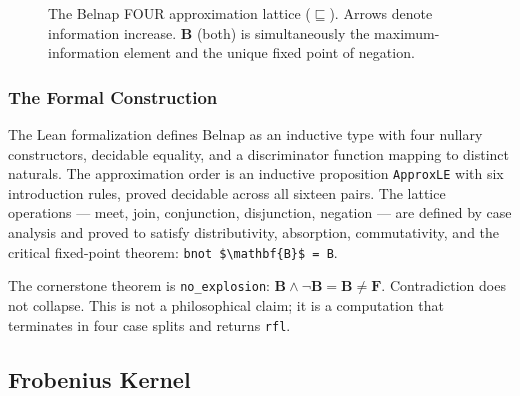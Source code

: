 \documentclass[10pt,a4paper]{article}
\begin{document}
\begin{figure}[htbp]
\centering
{}
\caption{The Belnap FOUR approximation lattice ($\sqsubseteq$). Arrows denote
information increase. $\mathbf{B}$ (both) is simultaneously the maximum-information
element and the unique fixed point of negation.}
\label{fig:belnap-four}
\end{figure}


\subsubsection{The Formal Construction}

The Lean formalization defines Belnap as an inductive type with four nullary constructors, decidable equality, and a discriminator function mapping to distinct naturals. The approximation order is an inductive proposition \texttt{ApproxLE} with six introduction rules, proved decidable across all sixteen pairs. The lattice operations --- meet, join, conjunction, disjunction, negation --- are defined by case analysis and proved to satisfy distributivity, absorption, commutativity, and the critical fixed-point theorem: \texttt{bnot \$\textbackslash{}mathbf\{B\}\$ = B}.

The cornerstone theorem is \texttt{no\_\allowbreak explosion}: $\mathbf{B} \land \neg \mathbf{B} = \mathbf{B} \neq \mathbf{F}$. Contradiction does not collapse. This is not a philosophical claim; it is a computation that terminates in four case splits and returns \texttt{rfl}.

\subsection{Frobenius Kernel}
\end{document}
